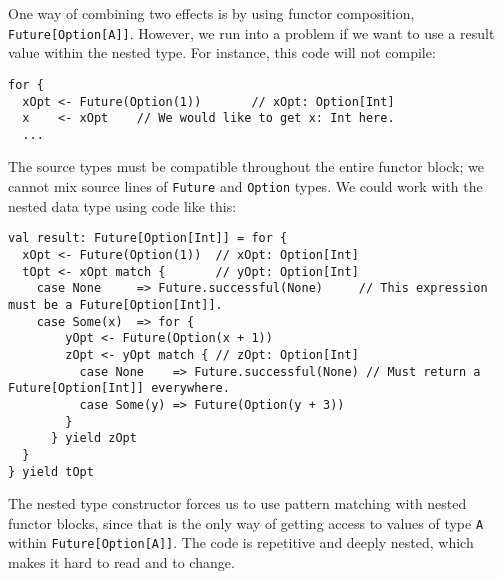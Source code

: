 One way of combining two effects is by using functor composition,
\lstinline!Future[Option[A]]!. However, we run into a problem if
we want to use a result value within the nested type. For instance,
this code will not compile:
\begin{lstlisting}
for {
  xOpt <- Future(Option(1))       // xOpt: Option[Int]
  x    <- xOpt    // We would like to get x: Int here.
  ...
\end{lstlisting}
The source types must be compatible throughout the entire functor
block; we cannot mix source lines of \lstinline!Future! and \lstinline!Option!
types. We could work with the nested data type using code like this:
\begin{lstlisting}
val result: Future[Option[Int]] = for {
  xOpt <- Future(Option(1))  // xOpt: Option[Int]
  tOpt <- xOpt match {       // yOpt: Option[Int]
    case None     => Future.successful(None)     // This expression must be a Future[Option[Int]].
    case Some(x)  => for {
        yOpt <- Future(Option(x + 1))
        zOpt <- yOpt match { // zOpt: Option[Int]
          case None    => Future.successful(None) // Must return a Future[Option[Int]] everywhere.
          case Some(y) => Future(Option(y + 3))
        }
      } yield zOpt
  }
} yield tOpt
\end{lstlisting}
The nested type constructor forces us to use pattern matching with
nested functor blocks, since that is the only way of getting access
to values of type \lstinline!A! within \lstinline!Future[Option[A]]!.
The code is repetitive and deeply nested, which makes it hard to read
and to change. 

